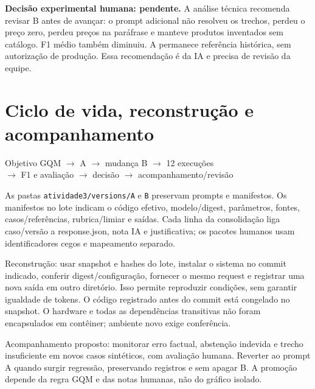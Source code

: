 \documentclass[a4paper,12pt]{article}
\newcommand{\arquivo}[1]{\nolinkurl{#1}}
\begin{document}
\textbf{Decisão experimental humana: pendente.} A análise técnica recomenda revisar B antes de avançar: o prompt adicional não resolveu os trechos, perdeu o preço zero, perdeu preços na paráfrase e manteve produtos inventados sem catálogo. F1 médio também diminuiu. A permanece referência histórica, sem autorização de produção. Essa recomendação é da IA e precisa de revisão da equipe.

\section{Ciclo de vida, reconstrução e acompanhamento}
\begin{center}\small Objetivo GQM $\rightarrow$ A $\rightarrow$ mudança B $\rightarrow$ 12 execuções\\
$\rightarrow$ F1 e avaliação $\rightarrow$ decisão $\rightarrow$ acompanhamento/revisão\end{center}
As pastas \arquivo{atividade3/versions/A} e \arquivo{B} preservam prompts e manifestos. Os manifestos no lote indicam o código efetivo, modelo/digest, parâmetros, fontes, casos/referências, rubrica/limiar e saídas. Cada linha da consolidação liga caso/versão a response.json, nota IA e justificativa; os pacotes humanos usam identificadores cegos e mapeamento separado.

Reconstrução: usar snapshot e hashes do lote, instalar o sistema no commit indicado, conferir digest/configuração, fornecer o mesmo request e registrar uma nova saída em outro diretório. Isso permite reproduzir condições, sem garantir igualdade de tokens. O código registrado antes do commit está congelado no snapshot. O hardware e todas as dependências transitivas não foram encapsulados em contêiner; ambiente novo exige conferência.

Acompanhamento proposto: monitorar erro factual, abstenção indevida e trecho insuficiente em novos casos sintéticos, com avaliação humana. Reverter ao prompt A quando surgir regressão, preservando registros e sem apagar B. A promoção depende da regra GQM e das notas humanas, não do gráfico isolado.
\end{document}
